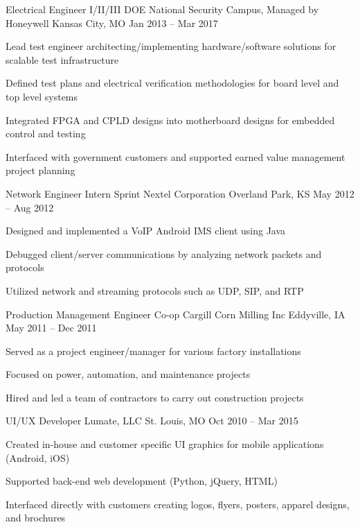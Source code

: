 \documentclass[]{awesome-cv}
\begin{document}
\begin{cventries}
{\begin{cvitems}
		\end{cvitems}}
	\cventry
	{Electrical Engineer I/II/III}
	{DOE National Security Campus, Managed by Honeywell}
	{Kansas City, MO}
	{Jan 2013 – Mar 2017}
	{\begin{cvitems}
		\item {Lead test engineer architecting/implementing hardware/software solutions for scalable test infrastructure}
		\item {Defined test plans and electrical verification methodologies for board level and top level systems}
		\item {Integrated FPGA and CPLD designs into motherboard designs for embedded control and testing}
		\item {Interfaced with government customers and supported earned value management project planning}
		\end{cvitems}}
	\cventry
	{Network Engineer Intern}
	{Sprint Nextel Corporation}
	{Overland Park, KS}
	{May 2012 – Aug 2012}
	{\begin{cvitems}
		\item {Designed and implemented a VoIP Android IMS client using Java}
		\item {Debugged client/server communications by analyzing network packets and protocols}
		\item {Utilized network and streaming protocols such as UDP, SIP, and RTP}
		\end{cvitems}}
	\cventry
	{Production Management Engineer Co-op}
	{Cargill Corn Milling Inc}
	{Eddyville, IA}
	{May 2011 – Dec 2011}
	{\begin{cvitems}
		\item {Served as a project engineer/manager for various factory installations}
		\item {Focused on power, automation, and maintenance projects}
		\item {Hired and led a team of contractors to carry out construction projects}
		\end{cvitems}}
	\cventry
	{UI/UX Developer}
	{Lumate, LLC}
	{St. Louis, MO}
	{Oct 2010 – Mar 2015}
	{\begin{cvitems}
		\item {Created in-house and customer specific UI graphics for mobile applications (Android, iOS)}
		\item {Supported back-end web development (Python, jQuery, HTML)}
		\item {Interfaced directly with customers creating logos, flyers, posters, apparel designs, and brochures}
		\end{cvitems}}
\end{cventries}
\end{document}
